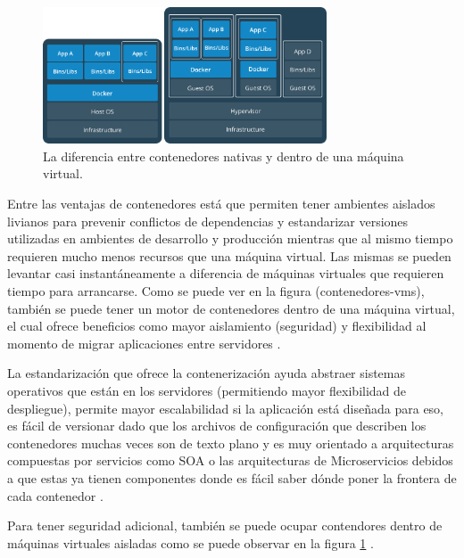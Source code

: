 \begin{figure}
  \begin{center}
      \includegraphics[width=0.75\textwidth]{Figures/contenedores-vms.png}
  \end{center}
  \caption{La diferencia entre contenedores nativas y dentro de una máquina virtual. \citep{Docker-Containers}}
  \label{contenedores-vms}
\end{figure}

 
Entre las ventajas de contenedores está que permiten tener ambientes aislados livianos para prevenir conflictos de dependencias y estandarizar versiones utilizadas en ambientes de desarrollo y producción mientras que al mismo tiempo requieren mucho menos recursos que una máquina virtual. Las mismas se pueden levantar casi instantáneamente a diferencia de máquinas virtuales que requieren tiempo para arrancarse. Como se puede ver en la figura (contenedores-vms), también se puede tener un motor de contenedores dentro de una máquina virtual, el cual ofrece beneficios como mayor aislamiento (seguridad) y flexibilidad al momento de migrar aplicaciones entre servidores \citep{Docker-Containers}.

La estandarización que ofrece la contenerización ayuda abstraer sistemas operativos que están en los servidores (permitiendo mayor flexibilidad de despliegue),  permite mayor escalabilidad si la aplicación está diseñada para eso, es fácil de versionar dado que los archivos de configuración que describen los contenedores muchas veces son de texto plano y es muy orientado a arquitecturas compuestas por servicios como SOA o las arquitecturas de Microservicios debidos a que estas ya tienen componentes donde es fácil saber dónde poner la frontera de cada contenedor \citep{DigitalOcean-Docker-Ecosystem}.

Para tener seguridad adicional, también se puede ocupar contendores dentro de máquinas virtuales aisladas como se puede observar en la figura \ref{contenedores-vms} \citep{Docker-Containers}.

